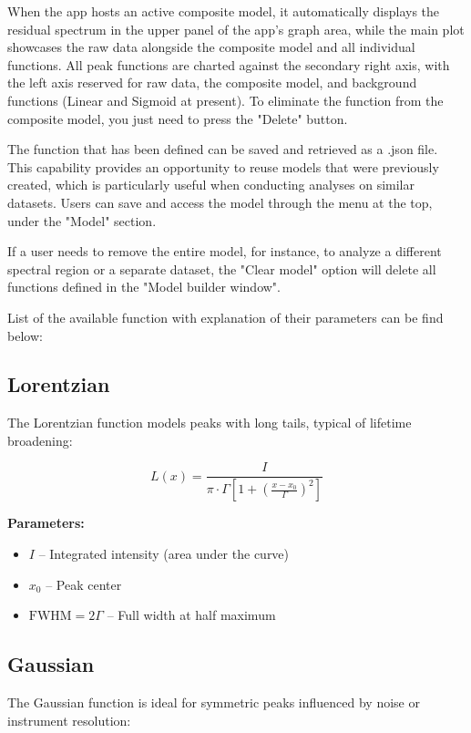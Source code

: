 \par
When the app hosts an active composite model, it automatically displays the residual spectrum in the upper panel of the app's graph area, while the main plot showcases the raw data alongside the composite model and all individual functions. All peak functions are charted against the secondary right axis, with the left axis reserved for raw data, the composite model, and background functions (Linear and Sigmoid at present). To eliminate the function from the composite model, you just need to press the "Delete" button.
\par
The function that has been defined can be saved and retrieved as a .json file. This capability provides an opportunity to reuse models that were previously created, which is particularly useful when conducting analyses on similar datasets. Users can save and access the model through the menu at the top, under the "Model" section.
\par
If a user needs to remove the entire model, for instance, to analyze a different spectral region or a separate dataset, the "Clear model" option will delete all functions defined in the "Model builder window".
\par
List of the available function with explanation of their parameters can be find below:
\subsection{Lorentzian}
The Lorentzian function models peaks with long tails, typical of lifetime broadening:

\begin{equation}
L(x) = \frac{I}{\pi \cdot \Gamma \left[1 + \left(\frac{x - x_0}{\Gamma}\right)^2 \right]}
\end{equation}

\textbf{Parameters:}
\begin{itemize}
    \item $I$ – Integrated intensity (area under the curve)
    \item $x_0$ – Peak center
    \item $\mathrm{FWHM} = 2\Gamma$ – Full width at half maximum
\end{itemize}

\subsection{Gaussian}
The Gaussian function is ideal for symmetric peaks influenced by noise or instrument resolution:

